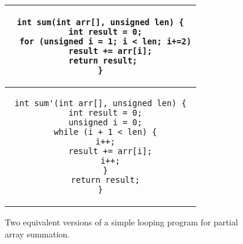 \begin{figure}
\centering
\begin{tabular} {c}
\begin{lstlisting}
int sum(int arr[], unsigned len) {
  int result = 0;
  for (unsigned i = 1; i < len; i+=2)
    result += arr[i];
 return result;
}
\end{lstlisting}
\\ \hline
\begin{lstlisting}
int sum'(int arr[], unsigned len) {
  int result = 0;
  unsigned i = 0;
  while (i + 1 < len) {
    i++;  
    result += arr[i];
    i++;
  }
  return result;
}
\end{lstlisting}
\end{tabular}
\caption{Two equivalent versions of a simple looping program for partial array summation.}
\end{figure} 
